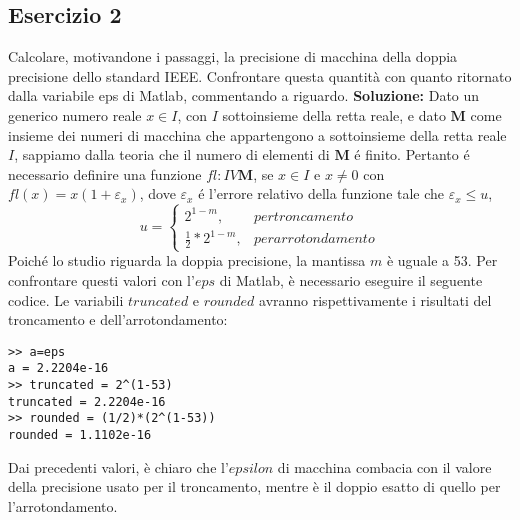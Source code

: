 \subsection{Esercizio 2}
Calcolare, motivandone i passaggi, la precisione di macchina della doppia precisione
dello standard IEEE. Confrontare questa quantità con quanto ritornato dalla variabile eps di
Matlab, commentando a riguardo.
\newline \textbf{Soluzione:} \newline
Dato un generico numero reale $x \in I$, con $I$ sottoinsieme della retta reale, e
dato $\mathbf{M}$ come insieme dei numeri di macchina che appartengono a sottoinsieme
della retta reale $I$, sappiamo dalla teoria che il numero di elementi di $\mathbf{M}$ é finito.
Pertanto é necessario definire una funzione $fl: I V \mathbf{M}$, se $x \in I$ e $x \neq 0$ con
$fl(x) = x(1 + \varepsilon_x)$, dove $\varepsilon_x$ é l'errore relativo della funzione tale che $\varepsilon_x \leq u$,
\begin{equation*}
    u =\begin{cases}
        2^{1-m},             & per troncamento    \\
        \frac{1}{2}*2^{1-m}, & per arrotondamento
    \end{cases}
\end{equation*}
Poiché lo studio riguarda la doppia precisione, la mantissa $m$ è uguale a 53.
Per confrontare questi valori con l'$eps$ di Matlab, è necessario eseguire il seguente codice.
Le variabili $truncated$ e $rounded$ avranno rispettivamente i risultati del troncamento e dell'arrotondamento:
\begin{lstlisting}
>> a=eps
a = 2.2204e-16
>> truncated = 2^(1-53)
truncated = 2.2204e-16
>> rounded = (1/2)*(2^(1-53))
rounded = 1.1102e-16
\end{lstlisting}
Dai precedenti valori, è chiaro che l'$epsilon$ di macchina combacia con il valore
della precisione usato per il troncamento, mentre è il doppio esatto di quello per
l'arrotondamento.
